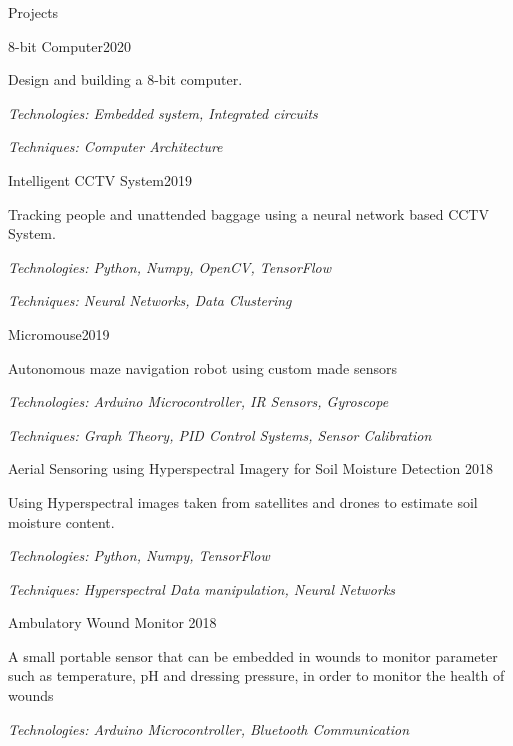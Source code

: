 \documentclass{resume} %
\begin{document}
\begin{rSection}{Projects}
\begin{rSubsection}{8-bit Computer}{2020}{}{}
\item Design and building a 8-bit computer. \item 
\textit{Technologies: Embedded system, Integrated circuits}
\item \textit{Techniques: Computer Architecture }
\end{rSubsection}

\begin{rSubsection}{Intelligent CCTV System}{2019}{}{}
\item Tracking people and unattended baggage using a neural network based CCTV System. \item 
\textit{Technologies: Python, Numpy, OpenCV, TensorFlow}
\item \textit{Techniques: Neural Networks, Data Clustering}
\end{rSubsection}


\begin{rSubsection}{Micromouse}{2019}{}{}
\item Autonomous maze navigation robot using custom made sensors 
\item \textit{Technologies: Arduino Microcontroller, IR Sensors, Gyroscope} 
\item \textit{Techniques: Graph Theory, PID Control Systems, Sensor Calibration}
\end{rSubsection}

\begin{rSubsection}{Aerial Sensoring using Hyperspectral Imagery for Soil Moisture Detection }{2018}{}{}
\item Using Hyperspectral images taken from satellites and drones to estimate soil moisture content. 
\item \textit{Technologies: Python, Numpy, TensorFlow}
\item \textit{Techniques: Hyperspectral Data manipulation, Neural Networks}
\end{rSubsection}


\begin{rSubsection}{Ambulatory Wound Monitor }{2018}{}{}
\item A small portable sensor that can be embedded in wounds to monitor parameter such as temperature, pH and dressing pressure, in order to monitor the health of wounds
\item \textit{Technologies: Arduino Microcontroller, Bluetooth Communication}
\end{rSubsection}




\end{rSection}
\end{document}
